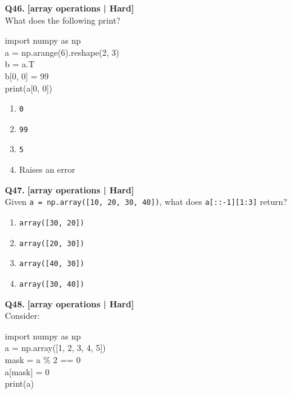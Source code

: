 \noindent\textbf{Q46.} \hfill {\small\color{LPUOrange}\textbf{[array operations | Hard]}}\\[2pt]
What does the following print? 

\begin{pycode}
import numpy as np\\
a = np.arange(6).reshape(2, 3)\\
b = a.T\\
b[0, 0] = 99\\
print(a[0, 0])
\end{pycode}

\begin{enumerate}[label=(\alph*),topsep=2pt,itemsep=1pt,partopsep=0pt,parsep=0pt]
    \item \relax \texttt{0}
    \item \relax \texttt{99}
    \item \relax \texttt{5}
    \item \relax Raises an error
\end{enumerate}
\vspace{2mm}

\noindent\textbf{Q47.} \hfill {\small\color{LPUOrange}\textbf{[array operations | Hard]}}\\[2pt]
Given \texttt{a = np.array([10, 20, 30, 40])}, what does \texttt{a[::-1][1:3]} return?

\begin{enumerate}[label=(\alph*),topsep=2pt,itemsep=1pt,partopsep=0pt,parsep=0pt]
    \item \relax \texttt{array([30, 20])}
    \item \relax \texttt{array([20, 30])}
    \item \relax \texttt{array([40, 30])}
    \item \relax \texttt{array([30, 40])}
\end{enumerate}
\vspace{2mm}

\noindent\textbf{Q48.} \hfill {\small\color{LPUOrange}\textbf{[array operations | Hard]}}\\[2pt]
Consider: 

\begin{pycode}
import numpy as np\\
a = np.array([1, 2, 3, 4, 5])\\
mask = a \% 2 == 0\\
a[mask] = 0\\
print(a)
\end{pycode}

